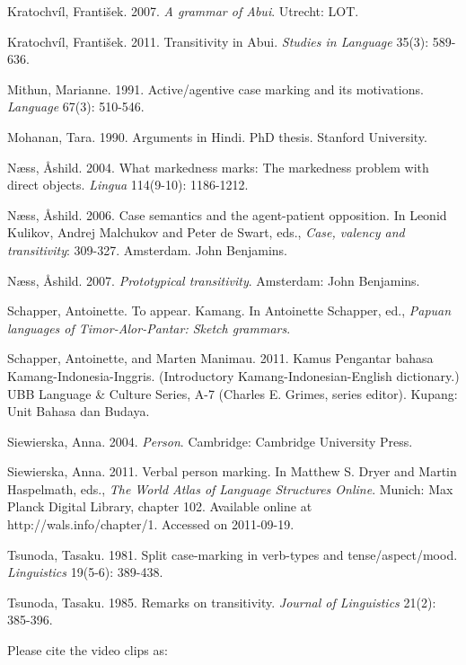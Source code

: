 Kratochv\'il, Franti\v{s}ek. 2007. \textit{A grammar of Abui}. Utrecht: LOT.

Kratochv\'il, Franti\v{s}ek. 2011. Transitivity in Abui. \textit{Studies in Language }35(3): 589{}-636.

Mithun, Marianne. 1991. Active/agentive case marking and its motivations. \textit{Language} 67(3): 510-546.

Mohanan, Tara. 1990. Arguments in Hindi. PhD thesis. Stanford University.

N{\ae}ss, {\AA}shild. 2004. What markedness marks: The markedness problem with direct objects. \textit{Lingua} 114(9-10): 1186-1212.

N{\ae}ss, {\AA}shild. 2006. Case semantics and the agent-patient opposition. In Leonid Kulikov, Andrej Malchukov and Peter de Swart, eds., \textit{Case, valency and transitivity}: 309-327. Amsterdam. John Benjamins.

N{\ae}ss, {\AA}shild. 2007. \textit{Prototypical transitivity}. Amsterdam: John Benjamins.

Schapper, Antoinette. To appear. Kamang. In Antoinette Schapper, ed., \textit{Papuan languages of Timor-Alor-Pantar: Sketch grammars}.

Schapper, Antoinette, and Marten Manimau. 2011. Kamus Pengantar bahasa Kamang-Indonesia-Inggris. (Introductory Kamang-Indonesian-English dictionary.) UBB Language \& Culture Series, A-7 (Charles E. Grimes, series editor). Kupang: Unit Bahasa dan Budaya. 

Siewierska, Anna. 2004. \textit{Person}. Cambridge: Cambridge University Press.

Siewierska, Anna. 2011. Verbal person marking. In Matthew S. Dryer and Martin Haspelmath, eds., \textit{The World Atlas of Language Structures Online}. Munich: Max Planck Digital Library, chapter 102. Available online at http://wals.info/chapter/1. Accessed on 2011-09-19.

Tsunoda, Tasaku. 1981. Split case-marking in verb-types and tense/aspect/mood. \textit{Linguistics} 19(5-6): 389-438.

Tsunoda, Tasaku. 1985. Remarks on transitivity. \textit{Journal of Linguistics} 21(2): 385-396.

Please cite the video clips as:


